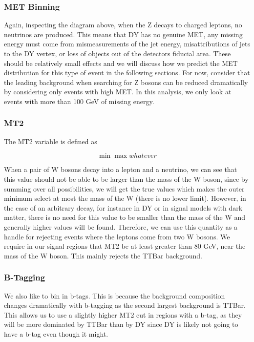     \subsubsection{MET Binning}
      Again, inspecting the diagram above, when the Z decays to charged leptons, no neutrinos are produced. This means that DY has no genuine MET, any missing energy must come from mismeasurements of the jet energy, misattributions of jets to the DY vertex, or loss of objects out of the detectors fiducial area. These should be relatively small effects and we will discuss how we predict the MET distribution for this type of event in the following sections. For now, consider that the leading background when searching for Z bosons can be reduced dramatically by considering only events with high MET. In this analysis, we only look at events with more than 100 GeV of missing energy.

    \subsubsection{MT2}
      The MT2 variable is defined as

      \[
      \min\max{whatever}
      \]

      When a pair of W bosons decay into a lepton and a neutrino, we can see that this value should not be able to be larger than the mass of the W boson, since by summing over all possibilities, we will get the true values which makes the outer minimum select at most the mass of the W (there is no lower limit). However, in the case of an arbitrary decay, for instance in DY or in signal models with dark matter, there is no need for this value to be smaller than the mass of the W and generally higher values will be found. Therefore, we can use this quantity as a handle for rejecting events where the leptons come from two W bosons. We require in our signal regions that MT2 be at least greater than 80 GeV, near the mass of the W boson. This mainly rejects the TTBar background. 

    \subsubsection{B-Tagging}
      We also like to bin in b-tags. This is because the background composition changes dramatically with b-tagging as the second largest background is TTBar. This allows us to use a slightly higher MT2 cut in regions with a b-tag, as they will be more dominated by TTBar than by DY since DY is likely not going to have a b-tag even though it might.

